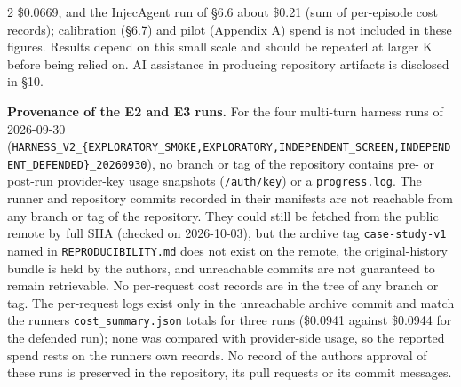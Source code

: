 \documentclass[9pt]{extarticle}
\begin{document}
\begin{multicols}{2}
\$0.0669, and the InjecAgent run of §6.6 about \$0.21 (sum of per-episode cost records); calibration (§6.7) and pilot (Appendix A) spend is not included in these figures. Results depend on this small scale and should be repeated at larger K before being relied on. AI assistance in producing repository artifacts is disclosed in §10.

\textbf{Provenance of the E2 and E3 runs.} For the four multi-turn harness runs of 2026-09-30 (\texttt{HARNESS\_V2\_\{EXPLORATORY\_SMOKE,\allowbreak{}EXPLORATORY,\allowbreak{}INDEPENDENT\_SCREEN,\allowbreak{}INDEPENDENT\_DEFENDED\}\_20260930}), no branch or tag of the repository contains pre- or post-run provider-key usage snapshots (\texttt{/\allowbreak{}auth/\allowbreak{}key}) or a \texttt{progress.log}. The runner and repository commits recorded in their manifests are not reachable from any branch or tag of the repository. They could still be fetched from the public remote by full SHA (checked on 2026-10-03), but the archive tag \texttt{case-study-v1} named in \texttt{REPRODUCIBILITY.md} does not exist on the remote, the original-history bundle is held by the authors, and unreachable commits are not guaranteed to remain retrievable. No per-request cost records are in the tree of any branch or tag. The per-request logs exist only in the unreachable archive commit and match the runner\textquotesingle s \texttt{cost\_\allowbreak{}summary.json} totals for three runs (\$0.0941 against \$0.0944 for the defended run); none was compared with provider-side usage, so the reported spend rests on the runner\textquotesingle s own records. No record of the authors\textquotesingle{} approval of these runs is preserved in the repository, its pull requests or its commit messages.


\end{multicols}
\end{document}

